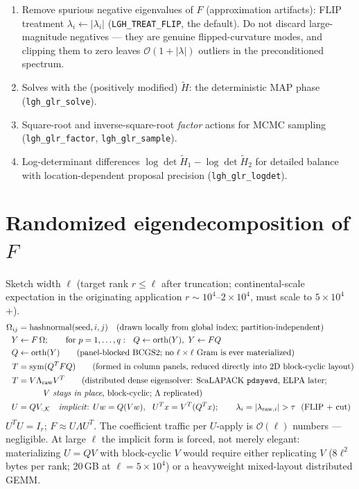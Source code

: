 \documentclass[11pt]{article}
\newcommand{\Ht}{\widetilde{H}}
\begin{document}
\begin{enumerate}
\item Remove spurious negative eigenvalues of $F$ (approximation artifacts):
      FLIP treatment $\lambda_i \leftarrow |\lambda_i|$
      (\texttt{LGH\_TREAT\_FLIP}, the default).  Do not discard large-magnitude
      negatives --- they are genuine flipped-curvature modes, and clipping them to
      zero leaves $\mathcal{O}(1+|\lambda|)$ outliers in the preconditioned spectrum.
\item Solves with the (positively modified) $\Ht$: the deterministic MAP phase
      (\texttt{lgh\_glr\_solve}).
\item Square-root and inverse-square-root \emph{factor} actions for MCMC sampling
      (\texttt{lgh\_glr\_factor}, \texttt{lgh\_glr\_sample}).
\item Log-determinant differences $\log\det\Ht_1 - \log\det\Ht_2$ for detailed
      balance with location-dependent proposal precision (\texttt{lgh\_glr\_logdet}).
\end{enumerate}

\section{Randomized eigendecomposition of $F$}

Sketch width $\ell$ (target rank $r \le \ell$ after truncation; continental-scale
expectation in the originating application $r \sim 10^4$--$2\times 10^4$, must scale
to $5\times 10^4$+).
\begin{align}
\Omega_{ij} &= \mathrm{hashnormal}(\mathrm{seed}, i, j)
   \quad (\text{drawn locally from global index; partition-independent})\\
Y &\leftarrow F\,\Omega; \qquad
   \text{for } p = 1,\dots,q: \ \ Q \leftarrow \mathrm{orth}(Y),\ Y \leftarrow FQ\\
Q &\leftarrow \mathrm{orth}(Y) \qquad
   (\text{panel-blocked BCGS2; no } \ell\times\ell \text{ Gram is ever materialized})\\
T &= \mathrm{sym}(Q^T F Q) \qquad
   (\text{formed in column panels, reduced directly into 2D block-cyclic layout})\\
T &= V \Lambda_{\mathrm{raw}} V^T \qquad
   (\text{distributed dense eigensolver: ScaLAPACK \texttt{pdsyevd}, ELPA later;}\\
&\qquad\quad V \text{ \emph{stays in place}, block-cyclic; } \Lambda \text{ replicated})\notag\\
U &= Q V_{:,\mathcal{K}} \quad \text{\emph{implicit}: } Uw = Q(Vw),\ \ U^T x = V^T(Q^T x);
   \qquad \lambda_i = |\lambda_{\mathrm{raw},i}| > \tau \ \ (\text{FLIP + cut})
\end{align}
$U^T U = I_r$; $F \approx U \Lambda U^T$.  The coefficient traffic per $U$-apply is
$\mathcal{O}(\ell)$ numbers --- negligible.  At large $\ell$ the implicit form is
forced, not merely elegant: materializing $U = QV$ with block-cyclic $V$ would
require either replicating $V$ ($8\ell^2$ bytes per rank; 20\,GB at
$\ell = 5\times 10^4$) or a heavyweight mixed-layout distributed GEMM.
\end{document}
